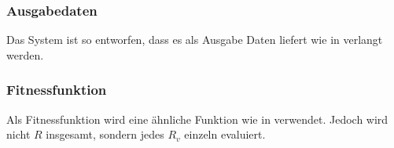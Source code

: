 \subsubsection{Ausgabedaten}
Das System ist so entworfen, dass es als Ausgabe Daten liefert wie in  verlangt werden.
\subsubsection{Fitnessfunktion}
Als Fitnessfunktion wird eine ähnliche Funktion wie in  verwendet. Jedoch wird nicht $R$ insgesamt, sondern jedes $R_v$ einzeln evaluiert.
